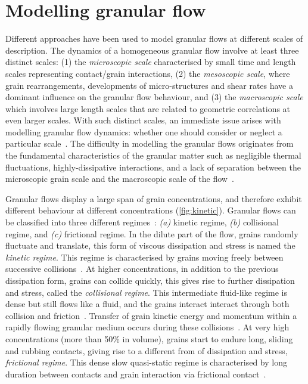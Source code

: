 \section{Modelling granular flow}

Different approaches have been used to model granular flows at different 
scales of description. The dynamics of a homogeneous granular flow involve at 
least three distinct scales: (1) the \textit{microscopic scale} characterised 
by small time and length scales representing contact/grain interactions, (2) 
the \textit{mesoscopic scale}, where grain rearrangements, developments of 
micro-structures and shear rates have a dominant influence on the granular flow 
behaviour, and (3) the \textit{macroscopic scale} which involves large length 
scales that are related to geometric correlations at even larger scales. With 
such distinct scales, an immediate issue arises with modelling granular flow 
dynamics: whether one should consider or neglect a particular 
scale~\citep{Radjai2009}. The difficulty in modelling the granular flows 
originates from the fundamental characteristics of the granular matter such as 
negligible thermal fluctuations, highly-dissipative interactions, and a lack of 
separation between the microscopic grain scale and the macroscopic scale of the 
flow~\citep{Goldhirsch2003}. 


Granular flows display a large span of grain concentrations, and therefore 
exhibit different behaviour at different concentrations (\cref{fig:kinetic}). 
Granular flows can be classified into three different 
regimes~\citep{Jaeger1996}: \textit{(a)} kinetic regime, \textit{(b)} 
collisional regime, and \textit{(c)} frictional regime. In the dilute part of 
the flow, grains randomly fluctuate and translate, this form of viscous 
dissipation and stress is named the \textit{kinetic regime}. This regime is 
characterised by grains moving freely between successive 
collisions~\citep{Goldhirsch2003}. At higher concentrations, in addition to the 
previous dissipation form, grains can collide quickly, this gives rise to 
further dissipation and stress, called the \textit{collisional regime}. This 
intermediate fluid-like regime is dense but still flows like a fluid, and the 
grains interact interact through both collision and 
friction~\citep{Midi2004,Pouliquen2002}. Transfer of 
grain kinetic energy and momentum within a rapidly flowing granular medium 
occurs during these collisions~\citep{Popken1999}. At very high 
concentrations (more than 50\% in volume), grains start to endure long, sliding 
and rubbing contacts, giving rise to a different from of 
dissipation and stress, \textit{frictional regime}. This dense slow 
quasi-static regime is characterised by long duration between contacts and 
grain interaction via frictional contact~\citep{Roux2002}. 


